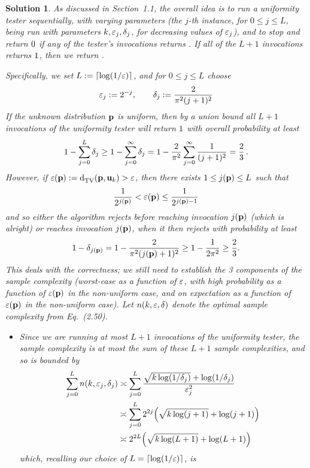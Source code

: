 \documentclass[biber,plain]{nowfnt} %
\newtheorem{solution}{Solution}[chapter]
\begin{document}
\begin{solution}%
As discussed in Section~1.1, the overall idea is to run a uniformity tester sequentially, with varying parameters (the $j$-th instance, for $0\leq j\leq L$, being run with parameters $k, \varepsilon_j, \delta_j$, for decreasing values of $\varepsilon_j$), and to stop and return $0$ if any of the tester's invocations returns \reject. If all of the $L+1$ invocations returns $1$, then we return \accept.

Specifically, we set $L\eqdef \clg{\log(1/\dst)}$, and for $0\leq j\leq L$ choose
\[
	\varepsilon_j := 2^{-j}, \qquad \delta_j := \frac{2}{\pi^2(j+1)^2}
\]
If the unknown distribution $\mathbf{p}$ \emph{is} uniform, then by a union bound all $L+1$ invocations of the uniformity tester will return $1$ with overall probability at least
\[
	1 - \sum_{j=0}^L \delta_j \geq 1 - \sum_{j=0}^\infty \delta_j = 1 - \frac{2}{\pi^2}\sum_{j=0}^\infty \frac{1}{(j+1)^2} = \frac{2}{3}\,.
\]
However, if $\dst(\p)\eqdef \totalvardist{\p}{\uniformOn{\ab}} > \dst$, then there exists $1\leq j(\mathbf{p})\leq L$ such that
\[
	\frac{1}{2^{j(\mathbf{p})}} < \varepsilon(\mathbf{p}) \leq \frac{1}{2^{j(\mathbf{p})-1}}
\]
and so either the algorithm rejects before reaching invocation $j(\mathbf{p})$ (which is alright) or reaches invocation $j(\mathbf{p})$, when it then rejects with probability at least
\[
	1-\delta_{j(\mathbf{p})} = 1-\frac{2}{\pi^2(j(\mathbf{p})+1)^2} \geq 1-\frac{1}{2\pi^2} \geq \frac{2}{3}.
\]
This deals with the correctness; we still need to establish the 3 components of the sample complexity (worst-case as a function of $\varepsilon$, with high probability as a function of $\varepsilon(\mathbf{p})$ in the non-uniform case, and on expectation as a function of $\varepsilon(\mathbf{p})$ in the non-uniform case). Let $n(k,\varepsilon, \delta)$ denote the optimal sample complexity from Eq.~(2.50).
\begin{itemize}
\item Since we are running at most $L+1$ invocations of the uniformity tester, the sample complexity is at most the sum of these $L+1$ sample complexities, and so is bounded by
\begin{align*}
	\sum_{j=0}^L \ns(\ab,\dst_j, \errprob_j)
	&\asymp \sum_{j=0}^L  \frac{\sqrt{\ab\log(1/\errprob_j)} + \log(1/\errprob_j)}{\dst_j^2} \\
	&\asymp \sum_{j=0}^L  2^{2j}\Paren{\sqrt{\ab\log(j+1)} + \log(j+1)}\\
	&\asymp 2^{2L}\Paren{\sqrt{\ab\log(L+1)} + \log(L+1)}
\end{align*}
which, recalling our choice of $L=\clg{\log(1/\dst)}$, is

\end{itemize}
\end{solution}
\end{document}

